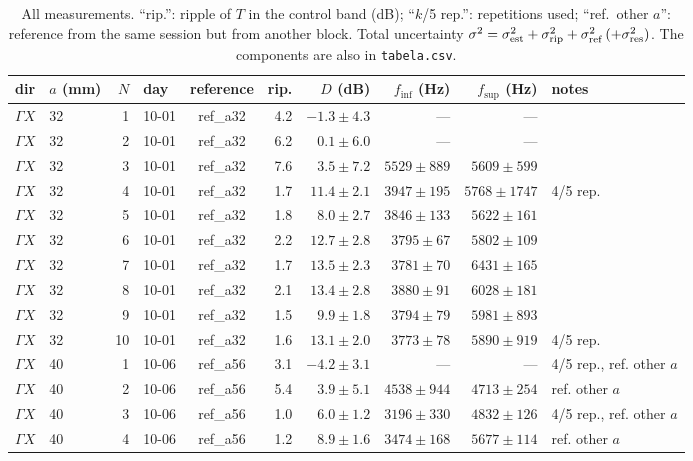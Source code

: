 \documentclass[9pt,a4paper,twocolumn]{extarticle}
\newcommand{\finf}{\ensuremath{f_{\mathrm{inf}}}}
\newcommand{\fsup}{\ensuremath{f_{\mathrm{sup}}}}
\begin{document}
\begin{table}[h]
\centering
\caption{All measurements. ``rip.'': ripple of $T$ in the control band (dB); ``$k$/5 rep.'': repetitions used; ``ref.\ other $a$'': reference from the same session but from another block. Total uncertainty $\sigma^2=\sigma_{\rm est}^2+\sigma_{\rm rip}^2+\sigma_{\rm ref}^2\,(+\sigma_{\rm res}^2)$. The components are also in \texttt{tabela.csv}.}
\scriptsize
\setlength{\tabcolsep}{4pt}
\renewcommand{\arraystretch}{0.93}
\begin{tabular}{llrlcrrrrl}
\toprule
dir & $a$ (mm) & $N$ & day & reference & rip. & $D$ (dB) & \finf{} (Hz) & \fsup{} (Hz) & notes\\
\midrule
$\Gamma X$ & 32 & 1 & 10-01 & ref\_a32 & 4.2 & $-1.3\pm4.3$ & --- & --- &  \\
$\Gamma X$ & 32 & 2 & 10-01 & ref\_a32 & 6.2 & $0.1\pm6.0$ & --- & --- &  \\
$\Gamma X$ & 32 & 3 & 10-01 & ref\_a32 & 7.6 & $3.5\pm7.2$ & $5529\pm889$ & $5609\pm599$ &  \\
$\Gamma X$ & 32 & 4 & 10-01 & ref\_a32 & 1.7 & $11.4\pm2.1$ & $3947\pm195$ & $5768\pm1747$ & 4/5 rep. \\
$\Gamma X$ & 32 & 5 & 10-01 & ref\_a32 & 1.8 & $8.0\pm2.7$ & $3846\pm133$ & $5622\pm161$ &  \\
$\Gamma X$ & 32 & 6 & 10-01 & ref\_a32 & 2.2 & $12.7\pm2.8$ & $3795\pm67$ & $5802\pm109$ &  \\
$\Gamma X$ & 32 & 7 & 10-01 & ref\_a32 & 1.7 & $13.5\pm2.3$ & $3781\pm70$ & $6431\pm165$ &  \\
$\Gamma X$ & 32 & 8 & 10-01 & ref\_a32 & 2.1 & $13.4\pm2.8$ & $3880\pm91$ & $6028\pm181$ &  \\
$\Gamma X$ & 32 & 9 & 10-01 & ref\_a32 & 1.5 & $9.9\pm1.8$ & $3794\pm79$ & $5981\pm893$ &  \\
$\Gamma X$ & 32 & 10 & 10-01 & ref\_a32 & 1.6 & $13.1\pm2.0$ & $3773\pm78$ & $5890\pm919$ & 4/5 rep. \\
\midrule
$\Gamma X$ & 40 & 1 & 10-06 & ref\_a56 & 3.1 & $-4.2\pm3.1$ & --- & --- & 4/5 rep., ref. other $a$ \\
$\Gamma X$ & 40 & 2 & 10-06 & ref\_a56 & 5.4 & $3.9\pm5.1$ & $4538\pm944$ & $4713\pm254$ & ref. other $a$ \\
$\Gamma X$ & 40 & 3 & 10-06 & ref\_a56 & 1.0 & $6.0\pm1.2$ & $3196\pm330$ & $4832\pm126$ & 4/5 rep., ref. other $a$ \\
$\Gamma X$ & 40 & 4 & 10-06 & ref\_a56 & 1.2 & $8.9\pm1.6$ & $3474\pm168$ & $5677\pm114$ & ref. other $a$ \\

\end{tabular}
\end{table}
\end{document}
